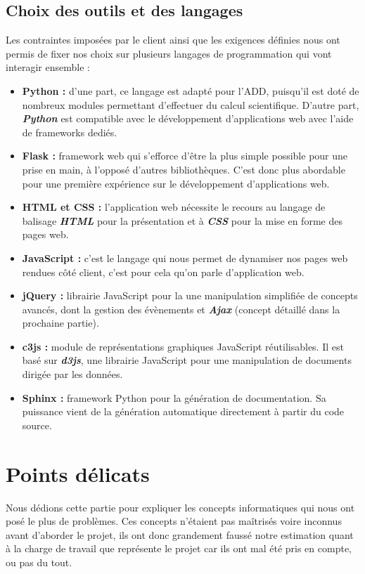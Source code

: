 		\subsection{Choix des outils et des langages}
		Les contraintes imposées par le client ainsi que les exigences définies nous ont permis de fixer nos choix sur plusieurs langages de programmation qui vont interagir ensemble : 
		\begin{itemize}[leftmargin=*]
			\item \textbf{Python :} d'une part, ce langage est adapté pour l'ADD, puisqu'il est doté de nombreux modules permettant d'effectuer du calcul scientifique. D'autre part, \textbf{\textit{Python}} est compatible avec le développement d’applications web avec l'aide de frameworks dediés.
			\item \textbf{Flask :}   framework web qui s’efforce d’être la plus simple possible pour une prise en main, à l'opposé d'autres bibliothèques. C'est donc plus abordable pour une première expérience sur le développement d'applications web.
			\item \textbf{HTML et CSS :} l'application web nécessite le recours au langage de balisage \textbf{\textit{HTML}} pour la présentation et à \textbf{\textit{CSS}} pour la mise en forme des pages web.
			\item \textbf{JavaScript :} c'est le langage qui nous permet de dynamiser nos pages web rendues côté client, c'est pour cela qu'on parle d'application web.
			\item \textbf{jQuery :} librairie JavaScript pour la une manipulation simplifiée de concepts avancés, dont la gestion des évènements et \textbf{\textit{Ajax}} (concept détaillé dans la prochaine partie).
			\item \textbf{c3js :} module de représentations graphiques JavaScript réutilisables. Il est basé sur \textbf{\textit{d3js}}, une librairie JavaScript pour une manipulation de documents dirigée par les données.
			\item \textbf{Sphinx :} framework Python pour la génération de documentation. Sa puissance vient de la génération automatique directement à partir du code source.
		\end{itemize}
		
	\section{Points délicats}
	Nous dédions cette partie pour expliquer les concepts informatiques qui nous ont posé le plus de problèmes. Ces concepts n'étaient pas maîtrisés voire inconnus avant d'aborder le projet, ils ont donc grandement faussé notre estimation quant à la charge de travail que représente le projet car ils ont mal été pris en compte, ou pas du tout.
